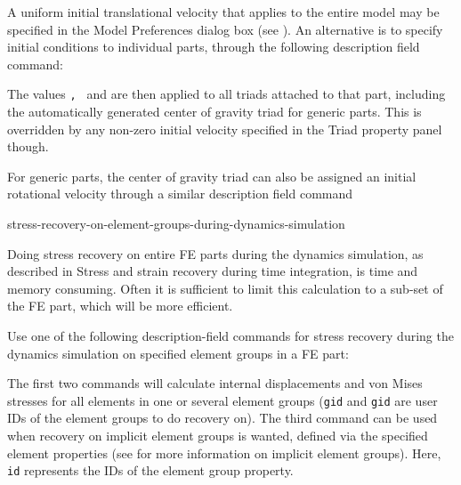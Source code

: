 
A uniform initial translational velocity that applies to the entire
model may be specified in the Model Preferences dialog box (see
). An
alternative is to specify initial conditions to individual parts,
through the following description field command:


\noindent
The values {\tt{}, } and
{\tt{}} are then applied to all triads attached to that
part, including the automatically generated center of gravity triad for generic
parts. This is overridden by any non-zero initial velocity specified in the
Triad property panel though.

For generic parts, the center of gravity triad can also be assigned an initial
rotational velocity through a similar description field command



           {stress-recovery-on-element-groups-during-dynamics-simulation}

Doing stress recovery on entire FE parts during the dynamics simulation,
as described in
{Stress and strain recovery during time integration},
is time and memory consuming. Often it is sufficient to limit this
calculation to a sub-set of the FE part, which will be more efficient.

Use one of the following description-field commands for stress recovery
during the dynamics simulation on specified element groups in a FE part:

\medskip
{}


\medskip

\noindent
The first two commands will calculate internal displacements and von Mises
stresses for all elements in one or several element groups ({\tt gid} and
{\tt gid} are user IDs of the element groups to do recovery on).
The third command can be used when recovery on implicit element groups is
wanted, defined via the specified element properties (see
 for more information
on implicit element groups).
Here, {\tt id} represents the IDs of the element group property.


